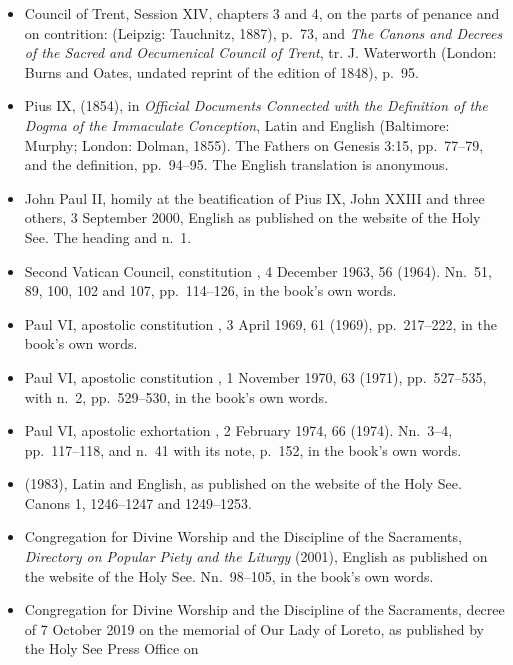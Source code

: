 \begin{itemize}[leftmargin=1.3em, itemsep=0.3em]
\item Council of Trent, Session XIV, chapters 3 and 4, on the parts of penance and on contrition:
 (Leipzig: Tauchnitz, 1887), p.~73, and \textit{The Canons and Decrees
of the Sacred and Oecumenical Council of Trent}, tr. J. Waterworth (London: Burns and Oates,
undated reprint of the edition of 1848), p.~95.
\item Pius IX,  (1854), in \textit{Official Documents Connected with the
Definition of the Dogma of the Immaculate Conception}, Latin and English (Baltimore: Murphy;
London: Dolman, 1855). The Fathers on Genesis 3:15, pp.~77--79, and the definition, pp.~94--95.
The English translation is anonymous.
\item John Paul II, homily at the beatification of Pius IX, John XXIII and three others,
3 September 2000, English as published on the website of the Holy See. The heading and n.~1.
\item Second Vatican Council, constitution , 4 December 1963,
 56 (1964). Nn.~51, 89, 100, 102 and 107, pp.~114--126, in the book's
own words.
\item Paul VI, apostolic constitution , 3 April 1969,  61 (1969), pp.~217--222, in the book's own words.
\item Paul VI, apostolic constitution , 1 November 1970,  63 (1971), pp.~527--535, with n.~2, pp.~529--530, in the book's own words.
\item Paul VI, apostolic exhortation , 2 February 1974,  66 (1974). Nn.~3--4, pp.~117--118, and n.~41 with its note, p.~152, in the book's
own words.
\item {} (1983), Latin and English, as published on the website of the
Holy See. Canons 1, 1246--1247 and 1249--1253.
\item Congregation for Divine Worship and the Discipline of the Sacraments, \textit{Directory on
Popular Piety and the Liturgy} (2001), English as published on the website of the Holy See.
Nn.~98--105, in the book's own words.
\item Congregation for Divine Worship and the Discipline of the Sacraments, decree of 7 October
2019 on the memorial of Our Lady of Loreto, as published by the Holy See Press Office on

\end{itemize}
